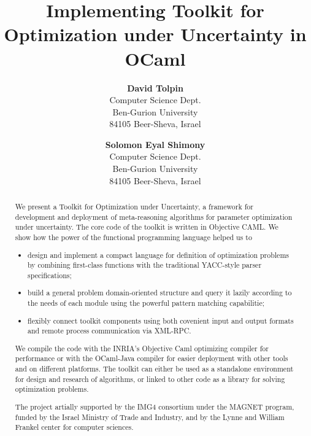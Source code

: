 \documentclass[]{article}
\title{Implementing Toolkit for Optimization under Uncertainty in OCaml}
\author{  {\bf David Tolpin} \\
Computer Science Dept. \\  
Ben-Gurion University \\ 
84105 Beer-Sheva, Israel \\ 
\and
 {\bf Solomon Eyal Shimony}  \\ 
Computer Science Dept. \\  
Ben-Gurion University \\ 
84105 Beer-Sheva, Israel \\ 
}
\begin{document}
 
 
\maketitle 

\begin{abstract} 

We present a Toolkit for Optimization under Uncertainty, a framework for
development and deployment of meta-reasoning algorithms for parameter
optimization under uncertainty. The core code of the toolkit is written
in Objective CAML. We show how the power of the functional programming
language helped us to

\begin{itemize}
\item design and implement a compact language for definition
      of optimization problems by combining first-class functions with
      the traditional YACC-style parser specifications;
\item build a general problem domain-oriented structure and query
      it lazily according to the needs of each module using the powerful
      pattern matching capabilitie;
\item flexibly connect toolkit components using both covenient input
      and output formats and remote process communication via XML-RPC.
\end{itemize}

We compile the code with the INRIA's Objective Caml optimizing compiler
for performance or with the OCaml-Java compiler for easier deployment
with other tools and on different platforms. The toolkit can either be
used as a standalone environment for design and research of algorithms,
or linked to other code as a library for solving optimization problems.

The project artially supported by the IMG4 consortium under the MAGNET
program, funded by the Israel Ministry of Trade and Industry, and by
the Lynne and William Frankel center for computer sciences.

\end{abstract}
\end{document}
